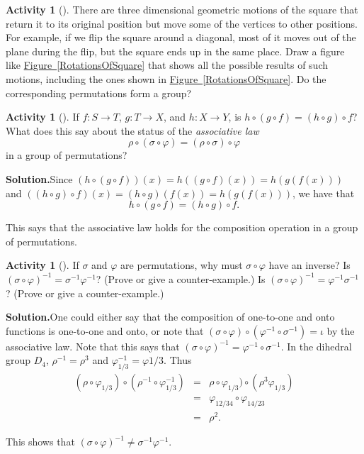 \documentclass[10pt,]{book}
\theoremstyle{plain}
\theoremstyle{definition}
\newtheorem{activity}[project]{Activity}
\numberwithin{equation}{chapter}
\newcommand{\amp}{&}
\begin{document}
\begin{activity}[]\label{dihedral1}
There are three dimensional geometric motions of the square that return it to its original position but move some of the vertices to other positions. For example, if we flip the square around a diagonal, most of it moves out of the plane during the flip, but the square ends up in the same place. Draw a figure like \hyperref[RotationsOfSquare]{Figure~\ref{RotationsOfSquare}} that shows all the possible results of such motions, including the ones shown in \hyperref[RotationsOfSquare]{Figure~\ref{RotationsOfSquare}}. Do the corresponding permutations form a group?%
\end{activity}
\begin{activity}[]\label{activity-244}
If \(f:S\rightarrow T\), \(g:T\rightarrow X\), and \(h:X \rightarrow Y\), is \(h\circ(g\circ f) = (h\circ g)\circ f\)? What does this say about the status of the \emph{associative law}%
\begin{equation*}
\rho\circ(\sigma\circ \varphi) = (\rho\circ \sigma)\circ\varphi
\end{equation*}
in a group of permutations?%
\par\medskip\noindent%
\textbf{Solution.}\quad Since \((h\circ(g\circ f)) (x) = h((g\circ f)(x)) = h(g(f(x)))\) and \(((h\circ
g)\circ f) (x) = (h\circ g)(f(x)) = h(g(f(x)))\), we have that%
\begin{equation*}
h\circ (g\circ f) =
(h\circ g)\circ f.
\end{equation*}
%
\par
This says that the associative law holds for the composition operation in a group of permutations.%
\end{activity}
\begin{activity}[]\label{activity-245}
If \(\sigma\) and \(\varphi\) are permutations, why must \(\sigma\circ\varphi\) have an inverse? Is \((\sigma\circ\varphi)^{-1}=
\sigma^{-1}\varphi^{-1}\)? (Prove or give a counter-example.) Is \((\sigma\circ\varphi)^{-1}=
\varphi^{-1}\sigma^{-1}\)? (Prove or give a counter-example.)%
\par\medskip\noindent%
\textbf{Solution.}\quad One could either say that the composition of one-to-one and onto functions is one-to-one and onto, or note that \((\sigma\circ\varphi)\circ (\varphi^{-1}\circ
\sigma^{-1}) =\iota\) by the associative law. Note that this says that \((\sigma \circ
\varphi)^{-1}= \varphi^{-1}\circ \sigma^{-1}\). In the dihedral group \(D_4\), \(\rho^{-1}= \rho^3\) and \(\varphi_{1/3}^{-1} = \varphi{1/3}\). Thus%
\begin{align*}
(\rho\circ \varphi_{1/3})\circ (\rho^{-1}\circ
\varphi_{1/3}^{-1})\amp =\amp \rho\circ
\varphi_{1/3})\circ(\rho^3\varphi_{1/3})\\
\amp =\amp \varphi_{12/34}\circ \varphi_{14/23}\\
\amp =\amp \rho^2.
\end{align*}
%
\par
This shows that \((\sigma\circ\varphi)^{-1}\not=
\sigma^{-1}\varphi^{-1}\).%
\end{activity}
\end{document}
